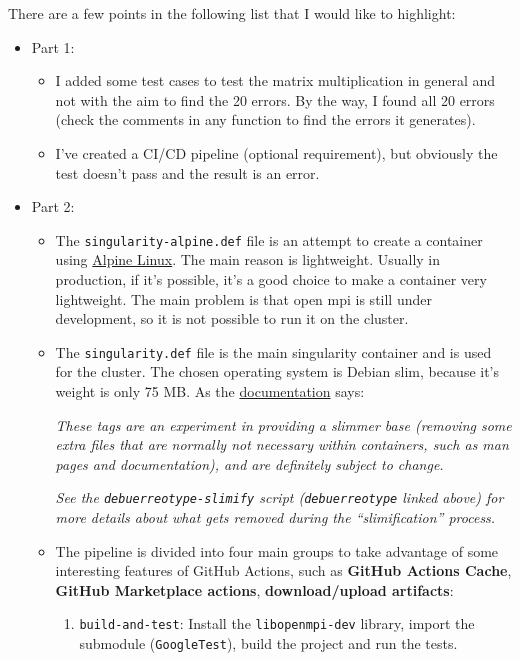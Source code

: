 \documentclass[a4paper]{article}
\newcommand{\dquotes}[1]{``#1''}
\newcommand{\highspace}{\vspace{1.2em}\noindent}
\begin{document}
    \highspace
    There are a few points in the following list that I would like to highlight:
    \begin{itemize}
        \item Part 1:
        \begin{itemize}
            \item I added some test cases to test the matrix multiplication in general and not with the aim to find the 20 errors. By the way, I found all 20 errors (check the comments in any function to find the errors it generates).
            
            \item I've created a CI/CD pipeline (optional requirement), but obviously the test doesn't pass and the result is an error.
        \end{itemize}
        
        \item Part 2:
        \begin{itemize}
            \item The \texttt{singularity-alpine.def} file is an attempt to create a container using \href{https://alpinelinux.org/about/}{Alpine Linux}. The main reason is lightweight. Usually in production, if it's possible, it's a good choice to make a container very lightweight. The main problem is that open mpi is still under development, so it is not possible to run it on the cluster.
            
            \item The \texttt{singularity.def} file is the main singularity container and is used for the cluster. The chosen operating system is Debian slim, because it's weight is only 75 MB. As the \href{https://hub.docker.com/_/debian}{documentation} says:
            \begin{center}
                \emph{These tags are an experiment in providing a slimmer base (removing some extra files that are normally not necessary within containers, such as man pages and documentation), and are definitely subject to change.}

                \emph{See the \texttt{debuerreotype-slimify} script (\texttt{debuerreotype} linked above) for more details about what gets removed during the \dquotes{slimification} process.}
            \end{center}

            \item The pipeline is divided into four main groups to take advantage of some interesting features of GitHub Actions, such as \textbf{GitHub Actions Cache}, \textbf{GitHub Marketplace actions}, \textbf{download/upload artifacts}:
            \begin{enumerate}
                \item \texttt{build-and-test}: Install the \texttt{libopenmpi-dev} library, import the submodule (\texttt{GoogleTest}), build the project and run the tests.


\end{enumerate}
\end{itemize}
\end{itemize}
\end{document}
